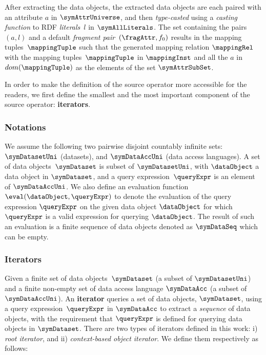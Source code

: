 After extracting the data objects, the extracted data objects are each paired
with an attribute $a$ in $\symAttrUniverse$, and then \emph{type-casted} using
a \emph{casting function} to RDF \emph{literals}~$l$ in $\symAllLiterals$.
The set containing the pairs~$(a,l)$ and a default \emph{fragment pair}~$(\fragAttr, f_0)$
results in the mapping tuples~$\mappingTuple$ such that the generated mapping
relation $\mappingRel$ with the mapping tuples~$\mappingTuple$ in $\mappingInst$ and
all the $a$ in $dom(\mappingTuple)$ as the elements of the set $\symAttrSubSet$.

In order to make the definition of the source operator more accessible for the
readers, we first define the smallest and the most important component of the
source operator: \textbf{iterators}.


\subsubsection{Notations}%
\label{ssub:notations}

We assume the following two pairwise disjoint countably infinite sets:
$\symDatasetUni$ (datasets), and  $\symDataAccUni$ (data access languages).
A set of data objects~$\symDataset$ is subset of $\symDatasetUni$, with
$\dataObject$ a data object in $\symDataset$, and a query
expression~$\queryExpr$ is an element of $\symDataAccUni$.
We also define an evaluation function $\eval(\dataObject, \queryExpr)$ to
denote the evaluation of the query expression $\queryExpr$ on the given data
object $\dataObject$ for which $\queryExpr$ is a valid expression for querying
$\dataObject$.
The result of such an evaluation is a finite sequence of data objects denoted
as $\symDataSeq$ which can be empty.


\subsubsection{Iterators}%
\label{ssub:iterators}
Given a finite set of data objects~$\symDataset$ (a subset of $\symDatasetUni$)
and a finite non-empty set of data access language $\symDataAcc$ (a subset of
$\symDataAccUni$).
An \textbf{iterator} queries a set of data objects, $\symDataset$, using a
query expression~$\queryExpr$ in $\symDataAcc$ to extract a \emph{sequence} of
data objects, with the requirement that $\queryExpr$ is defined for querying
data objects in $\symDataset$.
There are two types of iterators defined in this work: i) \emph{root iterator},
and ii) \emph{context-based object iterator}.
We define them respectively as follows:


